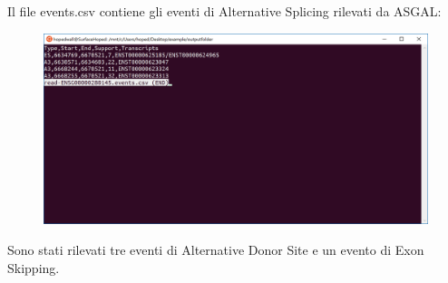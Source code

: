 \newpage

Il file events.csv contiene gli eventi di Alternative Splicing rilevati da ASGAL:


\begin{figure}[h!]
	\centering
	\includegraphics[width=\linewidth]{images/results.png}
  \label{fig:Parameters}
\end{figure}

Sono stati rilevati tre eventi di Alternative Donor Site e un evento di Exon Skipping.

\newpage